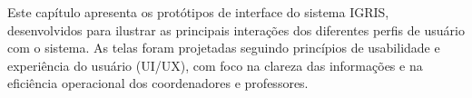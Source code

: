 ﻿Este capítulo apresenta os protótipos de interface do sistema IGRIS, desenvolvidos para ilustrar as principais interações dos diferentes perfis de usuário com o sistema. As telas foram projetadas seguindo princípios de usabilidade e experiência do usuário (UI/UX), com foco na clareza das informações e na eficiência operacional dos coordenadores e professores.


